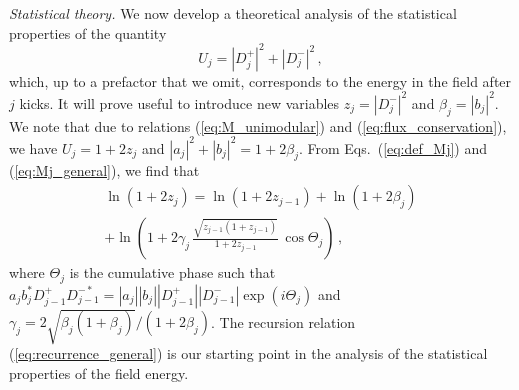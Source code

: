 \documentclass[ prl, twocolumn, superscriptaddress, amsfonts, amsmath,floatfix]{revtex4-1}
\begin{document}
{\it Statistical theory.}
We now develop a theoretical analysis of the statistical properties of the quantity
\begin{equation}
U_j =|D_j^+|^2 + |D_j^-|^2 \, ,
\label{eq:energy_Uj}
\end{equation}
which, up to a prefactor that we omit, corresponds to the energy in the field after $j$ kicks. It will prove useful to introduce new variables $z_j = |D_j^-|^2$ and $\beta_j = |b_j|^2$. We note that due to relations (\ref{eq:M_unimodular}) and (\ref{eq:flux_conservation}), we have $U_j = 1+2z_j$ and $|a_j|^2 + |b_j|^2=1+2\beta_j$. From Eqs.~(\ref{eq:def_Mj}) and (\ref{eq:Mj_general}), we find that
\begin{align}
\ln(1+2z_j) = \ln(1+2z_{j-1}) + \ln(1+2\beta_j) \nonumber \\
+ \ln \left (1 + 2 \gamma_j \, \frac{\sqrt{z_{j-1}(1+z_{j-1})}}{1+2z_{j-1}} \, \cos \Theta_j \right ) \, ,
\label{eq:recurrence_general}
\end{align}
where $\Theta_j$ is the cumulative phase such that $a_jb_j^* D_{j-1}^+ D_{j-1}^{-*} = |a_j| |b_j| |D_{j-1}^+| |D_{j-1}^-| \exp(i\Theta_j)$ and $\gamma_j=2\sqrt{\beta_j(1+\beta_j)}/(1+2\beta_j)$. The recursion relation (\ref{eq:recurrence_general}) is our starting point in the analysis of the statistical properties of the field energy. 
\end{document}
